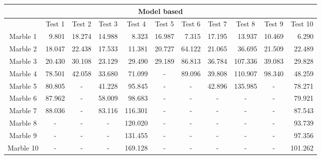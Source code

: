 \documentclass[../Head/Main.tex]{subfiles}
\begin{document}
\begin{table}[H]
\centering
\begin{tabular}{|c|r|c|r|r|c|c|c|c|c|r|}
\hline
\multicolumn{11}{|c|}{\textbf{Model based}} \\ \hline
 & \multicolumn{1}{c|}{Test 1} & Test 2 & \multicolumn{1}{c|}{Test 3} & \multicolumn{1}{c|}{Test 4} & Test 5 & Test 6 & \multicolumn{1}{c|}{Test 7} & Test 8 & Test 9 & \multicolumn{1}{c|}{Test 10} \\ \hline
Marble 1 & 9.801 & \multicolumn{1}{r|}{18.274} & 14.988 & 8.323 & \multicolumn{1}{r|}{16.987} & \multicolumn{1}{r|}{7.315} & 17.195 & \multicolumn{1}{r|}{13.937} & \multicolumn{1}{r|}{10.469} & 6.290 \\ \hline
Marble 2 & 18.047 & \multicolumn{1}{r|}{22.438} & 17.533 & 11.381 & \multicolumn{1}{r|}{20.727} & \multicolumn{1}{r|}{64.122} & 21.065 & \multicolumn{1}{r|}{36.695} & \multicolumn{1}{r|}{21.509} & 22.489 \\ \hline
Marble 3 & 20.430 & \multicolumn{1}{r|}{30.108} & 23.129 & 29.490 & \multicolumn{1}{r|}{29.189} & \multicolumn{1}{r|}{
86.813} & 36.784 & \multicolumn{1}{r|}{107.336
} & \multicolumn{1}{r|}{39.083} & 29.828 \\ \hline
Marble 4 & 78.501 & \multicolumn{1}{r|}{42.058} & 33.680 & 71.099 & - & \multicolumn{1}{r|}{
89.096} & 39.808 & \multicolumn{1}{r|}{110.907} & \multicolumn{1}{r|}{98.340} & 48.259 \\ \hline
Marble 5 & 80.805 & - & 41.228 & 95.845 & - & - & 42.896 & \multicolumn{1}{r|}{135.985} & - & 78.271 \\ \hline
Marble 6 & 87.962 & - & 58.009 & 98.683 & - & - & - & - & - & 79.921 \\ \hline
Marble 7 & 88.036 & - & 83.116 & 116.301 & - & - & - & - & - & 87.543 \\ \hline
Marble 8 & \multicolumn{1}{c|}{-} & - & \multicolumn{1}{c|}{-} & 120.020 & - & - & - & - & - & 93.739 \\ \hline
Marble 9 & \multicolumn{1}{c|}{-} & - & \multicolumn{1}{c|}{-} & 131.455 & - & - & - & - & - & 97.356 \\ \hline
Marble 10 & \multicolumn{1}{c|}{-} & - & \multicolumn{1}{c|}{-} & 169.128 & - & - & - & - & - & 101.262 \\ \hline
\end{tabular}
\end{table}
\end{document}
